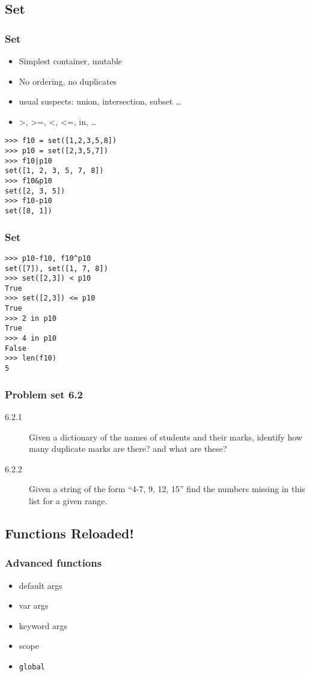 \documentclass[14pt,compress]{beamer}
\newcounter{time}
\newcommand{\inctime}[1]{\addtocounter{time}{#1}{\tiny \thetime\ m}}
\newcommand{\typ}[1]{\texttt{#1}}
\begin{document}
\subsection{Set}
\begin{frame}[fragile]
  \frametitle{Set}
    \begin{itemize}
      \item Simplest container, mutable
      \item No ordering, no duplicates
      \item usual suspects: union, intersection, subset \ldots
      \item >, >=, <, <=, in, \ldots
    \end{itemize}
    \begin{lstlisting}
>>> f10 = set([1,2,3,5,8])
>>> p10 = set([2,3,5,7])
>>> f10|p10
set([1, 2, 3, 5, 7, 8])
>>> f10&p10
set([2, 3, 5])
>>> f10-p10
set([8, 1])
\end{lstlisting}
\end{frame}

\begin{frame}[fragile]
  \frametitle{Set}
    \begin{lstlisting}
>>> p10-f10, f10^p10
set([7]), set([1, 7, 8])
>>> set([2,3]) < p10
True
>>> set([2,3]) <= p10
True
>>> 2 in p10
True
>>> 4 in p10
False
>>> len(f10)
5
\end{lstlisting}
\inctime{5}
\end{frame}


\begin{frame}
  \frametitle{Problem set 6.2}
  \begin{description}
    \item[6.2.1] Given a dictionary of the names of students and their marks, identify how many duplicate marks are there? and what are these?
    \item[6.2.2] Given a string of the form ``4-7, 9, 12, 15'' find the numbers missing in this list for a given range.
\end{description}
\inctime{10}
\end{frame}

\subsection{Functions Reloaded!}
\begin{frame}[fragile]
    \frametitle{Advanced functions}
    \begin{itemize}
        \item default args
        \item var args
        \item keyword args
        \item scope
        \item \typ{global}
      \end{itemize}
\end{frame}
\end{document}
